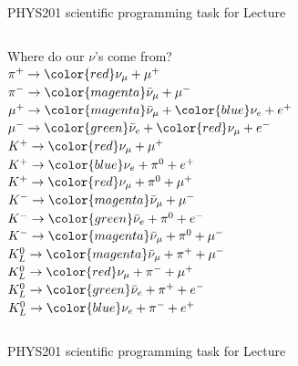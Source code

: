 {\begin{frame}{PHYS201 scientific programming task for Lecture \thislecture}
\begin{columns}
\begin{column}{0.22\textwidth}
     \begin{block}{}
     {\scriptsize
      Where do our $\nu$'s come from?\\
      \vspace{0.3cm}
      $\pi^{+} \rightarrow {\color{red}\nu_{\mu}} + \mu^{+}$\\
      $\pi^{-} \rightarrow {\color{magenta}\bar{\nu}_{\mu}} + \mu^{-}$\\
      $\mu^{+} \rightarrow {\color{magenta}\bar{\nu}_{\mu}} + {\color{blue}\nu_{e}} + e^{+}$\\
      $\mu^{-} \rightarrow {\color{green}\bar{\nu}_{e}} + {\color{red}\nu_{\mu}} + e^{-}$\\
      $K^{+} \rightarrow {\color{red}\nu_{\mu}} + \mu^{+}$\\
      $K^{+} \rightarrow {\color{blue}\nu_{e}} + \pi^{0} + e^{+}$\\
      $K^{+} \rightarrow {\color{red}\nu_{\mu}} + \pi^{0} + \mu^{+}$\\
      $K^{-} \rightarrow {\color{magenta}\bar{\nu}_{\mu}} + \mu^{-}$\\
      $K^{-} \rightarrow {\color{green}\bar{\nu}_{e}} + \pi^{0} + e^{-}$\\
      $K^{-} \rightarrow {\color{magenta}\bar{\nu}_{\mu}} + \pi^{0} + \mu^{-}$\\
      $K_{L}^{0} \rightarrow {\color{magenta}\bar{\nu}_{\mu}} + \pi^{+} + \mu^{-}$\\
      $K_{L}^{0} \rightarrow {\color{red}\nu_{\mu}} + \pi^{-} + \mu^{+}$\\
      $K_{L}^{0} \rightarrow {\color{green}\bar{\nu}_{e}} + \pi^{+} + e^{-}$\\
      $K_{L}^{0} \rightarrow {\color{blue}\nu_{e}} + \pi^{-} + e^{+}$\\
    }
    \end{block}
    \end{column}
  \end{columns}

\end{frame}


%
%
%

\begin{frame}{PHYS201 scientific programming task for Lecture \thislecture}


\end{frame}}
